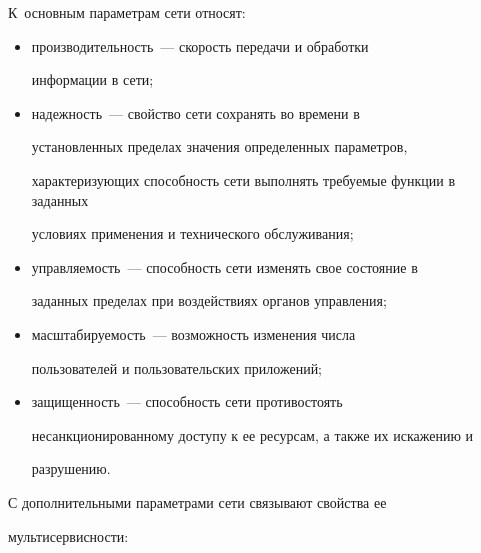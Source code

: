 К~основным параметрам сети относят:


      \begin{itemize}


      \item производительность~--- скорость передачи и обработки 


информации в сети;


      \item надежность~--- свойство сети сохранять во времени в 


установленных пределах значения определенных параметров, 


характеризующих способность сети выполнять требуемые функции в заданных 


условиях применения и технического обслуживания;


      \item управляемость~--- способность сети изменять свое состояние в 


заданных пределах при воздействиях органов управления;


      \item масштабируемость~--- возможность изменения чис\-ла 


пользователей и пользовательских приложений;


      \item защищенность~--- способность сети противостоять 


несанкционированному доступу к ее ресурсам, а также их искажению и 


разрушению.


      \end{itemize}


      


      С дополнительными параметрами сети связывают свойства ее 


мультисервисности:


